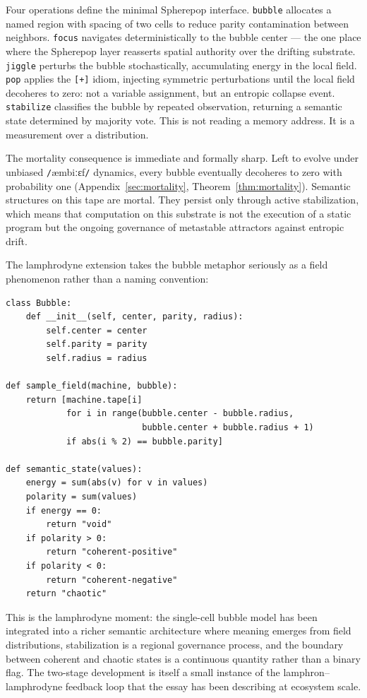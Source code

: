 \documentclass[11pt]{article}
\newcommand{\ambibf}{%
  \texttt{/}\textnormal{æmbiːɛf}\texttt{/}%
}
\begin{document}
Four operations define the minimal Spherepop interface. \texttt{bubble}
allocates a named region with spacing of two cells to reduce parity
contamination between neighbors. \texttt{focus} navigates deterministically
to the bubble center --- the one place where the Spherepop layer reasserts
spatial authority over the drifting substrate. \texttt{jiggle} perturbs the
bubble stochastically, accumulating energy in the local field. \texttt{pop}
applies the \texttt{[+]} idiom, injecting symmetric perturbations until the
local field decoheres to zero: not a variable assignment, but an entropic
collapse event. \texttt{stabilize} classifies the bubble by repeated
observation, returning a semantic state determined by majority vote. This is
not reading a memory address. It is a measurement over a distribution.

The mortality consequence is immediate and formally sharp. Left to evolve under
unbiased \ambibf{} dynamics, every bubble eventually decoheres to zero with
probability one (Appendix~\ref{sec:mortality}, Theorem~\ref{thm:mortality}).
Semantic structures on this tape are mortal. They persist only through active
stabilization, which means that computation on this substrate is not the
execution of a static program but the ongoing governance of metastable attractors
against entropic drift.

The lamphrodyne extension takes the bubble metaphor seriously as a field
phenomenon rather than a naming convention:

\begin{lstlisting}
class Bubble:
    def __init__(self, center, parity, radius):
        self.center = center
        self.parity = parity
        self.radius = radius

def sample_field(machine, bubble):
    return [machine.tape[i]
            for i in range(bubble.center - bubble.radius,
                           bubble.center + bubble.radius + 1)
            if abs(i % 2) == bubble.parity]

def semantic_state(values):
    energy = sum(abs(v) for v in values)
    polarity = sum(values)
    if energy == 0:
        return "void"
    if polarity > 0:
        return "coherent-positive"
    if polarity < 0:
        return "coherent-negative"
    return "chaotic"
\end{lstlisting}

This is the lamphrodyne moment: the single-cell bubble model has been integrated
into a richer semantic architecture where meaning emerges from field
distributions, stabilization is a regional governance process, and the boundary
between coherent and chaotic states is a continuous quantity rather than a binary
flag. The two-stage development is itself a small instance of the
lamphron--lamphrodyne feedback loop that the essay has been describing at
ecosystem scale.
\end{document}
